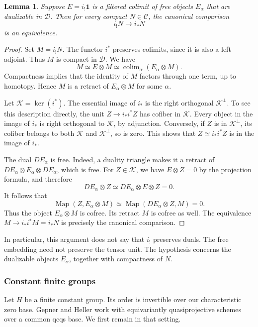 \documentclass[11pt,reqno]{amsart}
\newtheorem{lemma}[theorem]{Lemma}
\theoremstyle{definition}
\theoremstyle{remark}
\theoremstyle{plain}
\numberwithin{equation}{section}
\newcommand{\one}{\mathbf 1}
\DeclareMathOperator{\Map}{Map}
\DeclareMathOperator*{\colim}{colim}
\newcommand{\C}{\mathcal C}
\newcommand{\D}{\mathcal D}
\begin{document}
\begin{lemma}\label{lem:compact-free-cofree}
Suppose \(E = i_! \one\) is a filtered colimit of free objects \(E_\alpha\)
that are dualizable in \(\D\).
Then for every compact \(N\in\C\), the canonical comparison
\[
 i_!N\longrightarrow i_*N
\]
is an equivalence.
\end{lemma}
\begin{proof}
Set \(M=i_!N\).
The functor \(i^*\) preserves colimits, since it is also a left adjoint.
Thus \(M\) is compact in \(\D\).
We have
\[
 M\simeq E\otimes M\simeq\colim_\alpha(E_\alpha\otimes M).
\]
Compactness implies that the identity of \(M\) factors through one term, up to homotopy.
Hence \(M\) is a retract of \(E_\alpha\otimes M\) for some \(\alpha\).

Let \(\mathcal K=\ker(i^*)\).
The essential image of \(i_*\) is the right orthogonal \(\mathcal K^\perp\).
To see this description directly, the unit \(Z\to i_*i^*Z\) has cofiber in \(\mathcal K\).
Every object in the image of \(i_*\) is right orthogonal to \(\mathcal K\), by adjunction.
Conversely, if \(Z\) is in \(\mathcal K^\perp\), its cofiber belongs to both \(\mathcal K\) and \(\mathcal K^\perp\), so is zero. 
This shows that \(Z \simeq i_*i^*Z\) is in the image of \(i_*\). 

The dual \(DE_\alpha\) is free.
Indeed, a duality triangle makes it a retract of
\(DE_\alpha\otimes E_\alpha\otimes DE_\alpha\), which is free.
For \(Z\in\mathcal K\), we have \(E\otimes Z=0\) by the projection formula, and therefore
\[
 DE_\alpha\otimes Z
 \simeq DE_\alpha\otimes E\otimes Z=0.
\]
It follows that
\[
 \Map(Z,E_\alpha\otimes M)
 \simeq\Map(DE_\alpha\otimes Z,M)=0.
\]
Thus the object \(E_\alpha\otimes M\) is cofree.
Its retract \(M\) is cofree as well.
The equivalence \(M\to i_*i^*M=i_*N\) is precisely the canonical comparison.
\end{proof}

In particular, this argument does not say that \(i_!\) preserves duals.
The free embedding need not preserve the tensor unit.
The hypothesis concerns the dualizable objects \(E_\alpha\), together with compactness of \(N\).

\subsubsection*{Constant finite groups}
Let \(H\) be a finite constant group.
Its order is invertible over our characteristic zero base.
Gepner and Heller work with equivariantly quasiprojective schemes over a common qcqs base.
We first remain in that setting.
\end{document}
